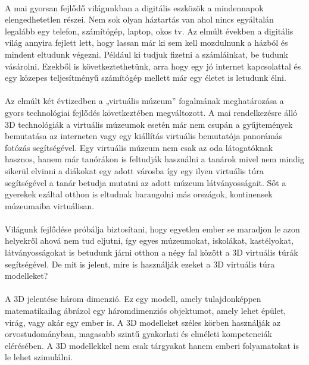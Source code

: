 \paragraph{}
A mai gyorsan fejlődő világunkban a digitális eszközök a mindennapok elengedhetetlen részei. Nem sok olyan háztartás van ahol nincs egyáltalán legalább egy telefon, számítógép, laptop, okos tv. Az elmúlt években a digitális világ annyira fejlett lett, hogy lassan már ki sem kell mozdulnunk a házból és mindent eltudunk végezni. Például ki tudjuk fizetni a számláinkat, be tudunk vásárolni. Ezekből is következtethetünk, arra hogy egy jó internet kapcsolattal és egy közepes teljesítményű számítógép mellett már egy életet is letudunk élni.
\paragraph{}
Az elmúlt két évtizedben a „virtuális múzeum” \cite{kersten2017development} fogalmának meghatározása a gyors technológiai fejlődés következtében megváltozott. A mai rendelkezésre álló 3D technológiák a virtuális múzeumok esetén már nem csupán a gyűjtemények bemutatása az interneten vagy egy kiállítás virtuális bemutatója panorámás fotózás segítségével. Egy virtuális múzeum nem csak az oda látogatóknak hasznos, hanem már tanórákon is feltudják használni a tanárok mivel nem mindig sikerül elvinni a diákokat egy adott városba így egy ilyen virtuális túra segítségével a tanár betudja mutatni az adott múzeum látványosságait. Sőt a gyerekek ezáltal otthon is eltudnak barangolni más országok, kontinensek múzeumaiba virtuálisan.
\paragraph{}
Világunk fejlődése próbálja biztosítani, hogy egyetlen ember se maradjon le azon helyekről ahová nem tud eljutni, így egyes múzeumokat, iskolákat, kastélyokat, látványosságokat is betudunk járni otthon a négy fal között a 3D virtuális túrák segítségével. De mit is jelent, mire is használják ezeket a 3D virtuális túra modelleket?
\paragraph{}
A 3D jelentése három dimenzió. Ez egy modell, amely tulajdonképpen matematikailag ábrázol egy háromdimenziós objektumot, amely lehet épület, virág, vagy akár egy ember is. A 3D modelleket széles körben használják az orvostudományban, magasabb szintű gyakorlati és elméleti kompetenciák elérésében. A 3D modellekkel nem csak tárgyakat hanem emberi folyamatokat is le lehet szimulálni.
